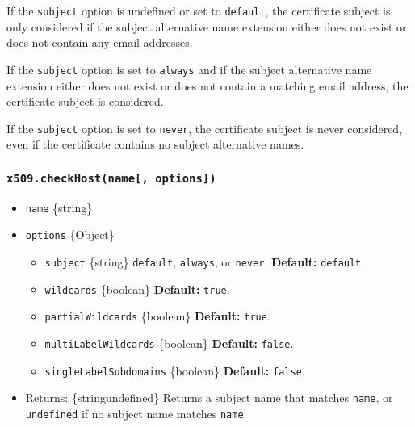 If the \texttt{\textquotesingle{}subject\textquotesingle{}} option is
undefined or set to
\texttt{\textquotesingle{}default\textquotesingle{}}, the certificate
subject is only considered if the subject alternative name extension
either does not exist or does not contain any email addresses.

If the \texttt{\textquotesingle{}subject\textquotesingle{}} option is
set to \texttt{\textquotesingle{}always\textquotesingle{}} and if the
subject alternative name extension either does not exist or does not
contain a matching email address, the certificate subject is considered.

If the \texttt{\textquotesingle{}subject\textquotesingle{}} option is
set to \texttt{\textquotesingle{}never\textquotesingle{}}, the
certificate subject is never considered, even if the certificate
contains no subject alternative names.

\subsubsection{\texorpdfstring{\texttt{x509.checkHost(name{[},\ options{]})}}{x509.checkHost(name{[}, options{]})}}\label{x509.checkhostname-options}

\begin{itemize}
\tightlist
\item
  \texttt{name} \{string\}
\item
  \texttt{options} \{Object\}

  \begin{itemize}
  \tightlist
  \item
    \texttt{subject} \{string\}
    \texttt{\textquotesingle{}default\textquotesingle{}},
    \texttt{\textquotesingle{}always\textquotesingle{}}, or
    \texttt{\textquotesingle{}never\textquotesingle{}}.
    \textbf{Default:}
    \texttt{\textquotesingle{}default\textquotesingle{}}.
  \item
    \texttt{wildcards} \{boolean\} \textbf{Default:} \texttt{true}.
  \item
    \texttt{partialWildcards} \{boolean\} \textbf{Default:}
    \texttt{true}.
  \item
    \texttt{multiLabelWildcards} \{boolean\} \textbf{Default:}
    \texttt{false}.
  \item
    \texttt{singleLabelSubdomains} \{boolean\} \textbf{Default:}
    \texttt{false}.
  \end{itemize}
\item
  Returns: \{string\textbar undefined\} Returns a subject name that
  matches \texttt{name}, or \texttt{undefined} if no subject name
  matches \texttt{name}.
\end{itemize}

